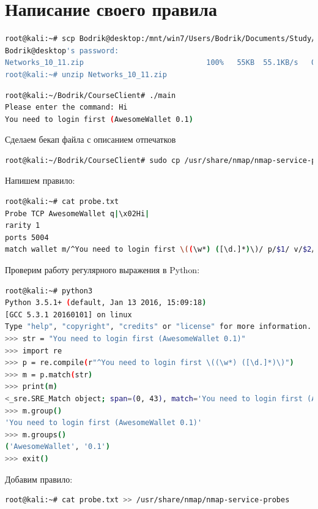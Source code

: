 \section{Написание своего правила}

\begin{lstlisting}[language=bash]
root@kali:~# scp Bodrik@desktop:/mnt/win7/Users/Bodrik/Documents/Study/Networks_new/Networks_10_11.zip .
Bodrik@desktop's password: 
Networks_10_11.zip                            100%   55KB  55.1KB/s   00:01    
root@kali:~# unzip Networks_10_11.zip 
\end{lstlisting}

\begin{lstlisting}[language=bash]
root@kali:~/Bodrik/CourseClient# ./main 
Please enter the command: Hi
You need to login first (AwesomeWallet 0.1)
\end{lstlisting}

Сделаем бекап файла с описанием отпечатков

\begin{lstlisting}[language=bash]
root@kali:~/Bodrik/CourseClient# sudo cp /usr/share/nmap/nmap-service-probes /usr/share/nmap/nmap-service-probes.backup
\end{lstlisting}

Напишем правило:

\begin{lstlisting}[language=bash]
root@kali:~# cat probe.txt 
Probe TCP AwesomeWallet q|\x02Hi|
rarity 1
ports 5004
match wallet m/^You need to login first \((\w*) ([\d.]*)\)/ p/$1/ v/$2/
\end{lstlisting}

Проверим работу регулярного выражения в Python:

\begin{lstlisting}[language=bash]
root@kali:~# python3
Python 3.5.1+ (default, Jan 13 2016, 15:09:18) 
[GCC 5.3.1 20160101] on linux
Type "help", "copyright", "credits" or "license" for more information.
>>> str = "You need to login first (AwesomeWallet 0.1)"
>>> import re
>>> p = re.compile(r"^You need to login first \((\w*) ([\d.]*)\)")
>>> m = p.match(str)
>>> print(m)
<_sre.SRE_Match object; span=(0, 43), match='You need to login first (AwesomeWallet 0.1)'>
>>> m.group()
'You need to login first (AwesomeWallet 0.1)'
>>> m.groups()
('AwesomeWallet', '0.1')
>>> exit()
\end{lstlisting}

Добавим правило:

\begin{lstlisting}[language=bash]
root@kali:~# cat probe.txt >> /usr/share/nmap/nmap-service-probes
\end{lstlisting}

